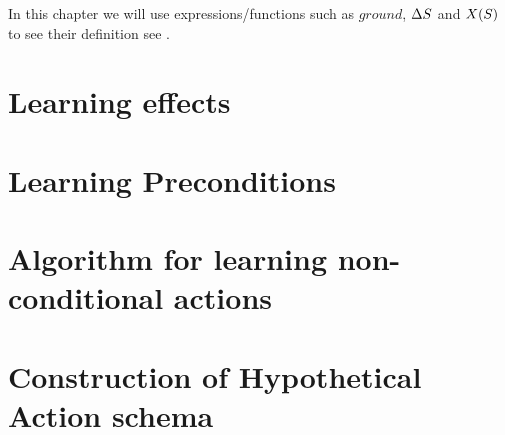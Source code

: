 \documentclass[Master.tex]{subfiles}
\begin{document}
In this chapter we will use expressions/functions such as $ground$, $\Delta S$ and $X(S)$ to see their definition see .

\section{Learning effects}\label{sec:NC:Effects}
    

\section{Learning Preconditions}\label{sec:NC:Preconditions}
    
    
\section{Algorithm for learning non-conditional actions}


\section{Construction of Hypothetical Action schema}\label{sec:NC:hypcon}
	
\end{document}

